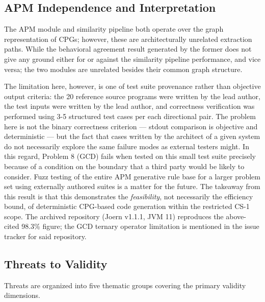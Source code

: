 {\subsection{APM Independence and Interpretation}
\label{subsec:apm_discussion}

The APM module and similarity pipeline both operate over the graph representation of CPGs; however, these are architecturally unrelated extraction paths. While the behavioral agreement result generated by the former does not give any ground either for or against the similarity pipeline performance, and vice versa; the two modules are unrelated besides their common graph structure.

The limitation here, however, is one of test suite provenance rather than objective output criteria: the 20 reference source programs were written by the lead author, the test inputs were written by the lead author, and correctness verification was performed using 3-5 structured test cases per each directional pair. The problem here is not the binary correctness criterion --- stdout comparison is objective and deterministic --- but the fact that cases written by the architect of a given system do not necessarily explore the same failure modes as external testers might. In this regard, Problem 8 (GCD) fails when tested on this small test suite precisely because of a condition on the boundary that a third party would be likely to consider. Fuzz testing of the entire APM generative rule base for a larger problem set using externally authored suites is a matter for the future. The takeaway from this result is that this demonstrates the \textit{feasibility}, not necessarily the efficiency bound, of deterministic CPG-based code generation within the restricted CS-1 scope. The archived repository (Joern v1.1.1, JVM 11) reproduces the above-cited 98.3\% figure; the GCD ternary operator limitation is mentioned in the issue tracker for said repository.

\subsection{Threats to Validity}
\label{subsec:threats}

Threats are organized into five thematic groups covering the primary validity dimensions.

}
